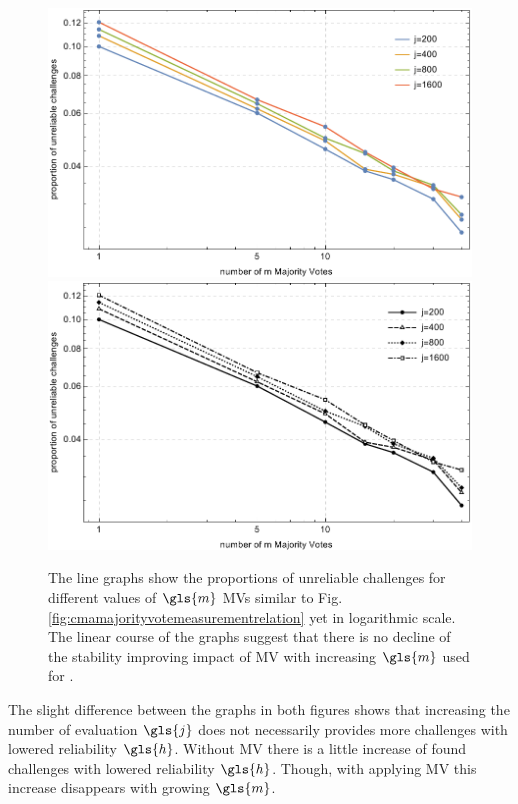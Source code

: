 \begin{figure}[ht]
\ifx{}\undefined
{}
\else
	\if{}
	\centering
	\includegraphics[width=1.00\textwidth]{images/mv-measurements-unstableChallenges_loglog.pdf}
	\else
	\includegraphics[width=1.00\textwidth]{images/mv-measurements-unstableChallenges_loglog_mono.pdf}
	\fi
\fi
\caption[Proportion of unreliable challenges logarithmic]{The line graphs show the proportions of unreliable challenges for different values of $\gls{m}$ \acp{MV} similar to Fig. \ref{fig:cmamajorityvotemeasurementrelation} yet in logarithmic scale. The linear course of the graphs suggest that there is no decline of the stability improving impact of \ac{MV} with increasing $\gls{m}$ used for \mpufs.}
\label{fig:cmamajorityvotemeasurementrelationloglog}
\end{figure}

The slight difference between the graphs in both figures shows that increasing the number of evaluation $\gls{j}$ does not necessarily provides more challenges with lowered reliability $\gls{h}$.
Without \ac{MV} there is a little increase of found challenges with lowered reliability $\gls{h}$.
Though, with applying \ac{MV} this increase disappears with growing $\gls{m}$.

